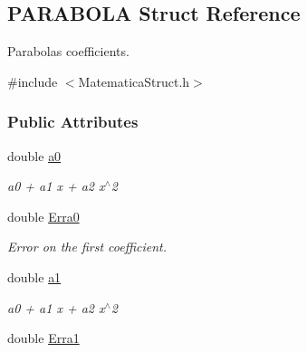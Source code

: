 \hypertarget{structPARABOLA}{\subsection{\-P\-A\-R\-A\-B\-O\-L\-A \-Struct \-Reference}
\label{structPARABOLA}
}


\-Parabolas coefficients.  




{\ttfamily \#include $<$\-Matematica\-Struct.\-h$>$}

\subsubsection*{\-Public \-Attributes}
\begin{DoxyCompactItemize}
\item 
\hypertarget{structPARABOLA_ad95dcba445836b4ba94129111a4b888c}{double \hyperlink{structPARABOLA_ad95dcba445836b4ba94129111a4b888c}{a0}}\label{structPARABOLA_ad95dcba445836b4ba94129111a4b888c}

\begin{DoxyCompactList}\small\item\em a0 + a1 x + a2 x$^\wedge$2 \end{DoxyCompactList}\item 
\hypertarget{structPARABOLA_adc871ead9d8fc23f2009f42306b04a5e}{double \hyperlink{structPARABOLA_adc871ead9d8fc23f2009f42306b04a5e}{\-Erra0}}\label{structPARABOLA_adc871ead9d8fc23f2009f42306b04a5e}

\begin{DoxyCompactList}\small\item\em \-Error on the first coefficient. \end{DoxyCompactList}\item 
\hypertarget{structPARABOLA_a5d015a3751aec61f2442b957cb6f517a}{double \hyperlink{structPARABOLA_a5d015a3751aec61f2442b957cb6f517a}{a1}}\label{structPARABOLA_a5d015a3751aec61f2442b957cb6f517a}

\begin{DoxyCompactList}\small\item\em a0 + a1 x + a2 x$^\wedge$2 \end{DoxyCompactList}\item 
\hypertarget{structPARABOLA_a9097314f53ed21d9ca0286f35e86d82d}{double \hyperlink{structPARABOLA_a9097314f53ed21d9ca0286f35e86d82d}{\-Erra1}}\label{structPARABOLA_a9097314f53ed21d9ca0286f35e86d82d}


\end{DoxyCompactItemize}
